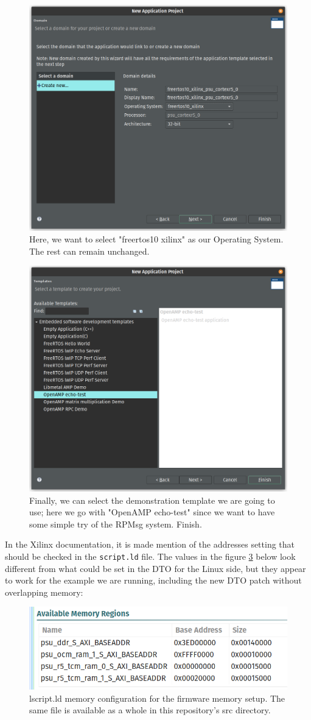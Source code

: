 \documentclass[10pt]{article}
\begin{document}
\begin{figure}[htbp]
\centering
\includegraphics[width=.6\textwidth]{./img/vitis_new/project6.png}
\caption{\label{fig:org6a57ae6}Here, we want to select "freertos10 xilinx" as our Operating System. The rest can remain unchanged.}
\end{figure}

\begin{figure}[htbp]
\centering
\includegraphics[width=.6\textwidth]{./img/vitis_new/project7.png}
\caption{\label{fig:org47cf67d}Finally, we can select the demonstration template we are going to use; here we go with "OpenAMP echo-test" since we want to have some simple try of the RPMsg system. Finish.}
\end{figure}

\pagebreak
In the Xilinx documentation, it is made mention of the addresses setting that should be checked in the \texttt{script.ld} file.
The values in the figure \ref{fig:org95f5ffc} below look different from what could be set in the DTO for the Linux side, but they appear to
work for the example we are running, including the new DTO patch without overlapping memory:


\begin{figure}[htbp]
\centering
\includegraphics[width=.6\textwidth]{./img/vitis_new/project_mem.png}
\caption{\label{fig:org95f5ffc}lscript.ld memory configuration for the firmware memory setup. The same file is available as a whole in this repository's src directory.}
\end{figure}
\end{document}
